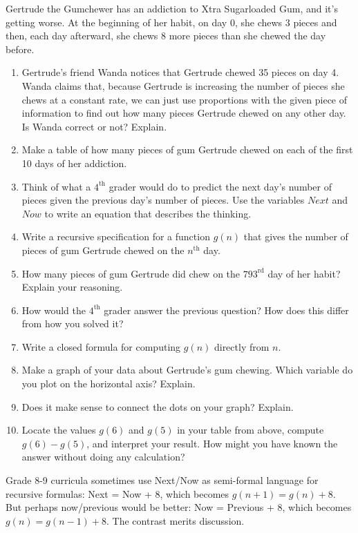 \documentclass{ximera}
\begin{document}
\begin{problem}%
Gertrude the Gumchewer has an addiction to Xtra Sugarloaded Gum, and it's getting worse.  At the beginning of her habit, on day 0, she chews 3 pieces and then, each day afterward, she chews 8 more pieces than she chewed the day before.
\begin{enumerate}
\item Gertrude's friend Wanda notices that Gertrude chewed 35 pieces on day 4.  Wanda claims that, because Gertrude is increasing the number of pieces she chews at a constant rate, we can just use proportions with the given piece of information to find out how many pieces Gertrude chewed on any other day.  Is Wanda correct or not?  Explain. 
\item Make a table of how many pieces of gum Gertrude chewed on each of the first 10 days of her addiction.  
\item Think of what a $4^\mathrm{th}$ grader would do to predict the next day's number of pieces given the previous day's number of pieces.  Use the variables $Next$ and $Now$ to write an equation that describes the thinking.
\item Write a recursive specification for a function $g(n)$ that gives the number of pieces of gum Gertrude chewed on the $n^\mathrm{th}$ day.  
\item How many pieces of gum Gertrude did chew on the $793^\mathrm{rd}$ day of her habit?  Explain your reasoning.  
\item How would the $4^\mathrm{th}$ grader answer the previous question?  How does this differ from how you solved it?
\item Write a closed formula for computing $g(n)$ directly from $n$.  
\item Make a graph of your data about Gertrude's gum chewing.  Which variable do you plot on the horizontal axis?  Explain.  
\item Does it make sense to connect the dots on your graph?  Explain.  
\item  Locate the values $g(6)$ and $g(5)$ in your table from above, compute  $g(6) - g(5)$, and interpret your result.  How might you have known the answer without doing any calculation?  
\end{enumerate}
\begin{teachingnote}
Grade 8-9 curricula sometimes use Next/Now as semi-formal language for recursive formulas: Next = Now + 8, which becomes $g(n+1) = g(n)+8$. But perhaps now/previous would be better: Now = Previous + 8, which becomes $g(n) = g(n-1) + 8$. The contrast merits discussion.
\end{teachingnote}
\end{problem}
\end{document}
